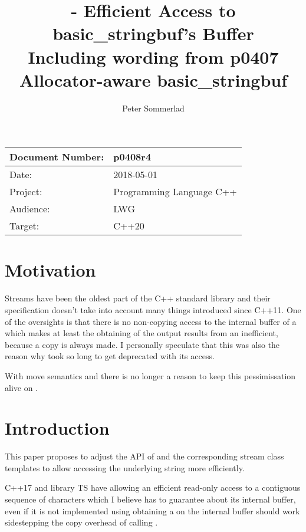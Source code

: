 \documentclass[ebook,11pt,article]{memoir}
\title{\papernumber{} - Efficient Access to basic\_stringbuf's Buffer\\
Including wording from p0407 Allocator-aware basic\_stringbuf}
\author{Peter Sommerlad}
\date{\paperdate}                        %
\newcommand{\papernumber}{p0408r4}
\newcommand{\paperdate}{2018-05-01}
\begin{document}
\maketitle
\begin{tabular}[t]{|l|l|}\hline 
Document Number: & \papernumber  \\\hline
Date: & \paperdate \\\hline
Project: & Programming Language C++\\\hline 
Audience: & LWG\\\hline
Target: & C++20\\\hline
\end{tabular}

\chapter{Motivation}
Streams have been the oldest part of the C++ standard library and their specification doesn't take into account many things introduced since C++11. One of  the oversights is that there is no non-copying access to the internal buffer of a  which makes at least the obtaining of the output results from an  inefficient, because a copy is always made. I personally speculate that this was also the reason why  took so long to get deprecated with its  access.

With move semantics and  there is no longer a reason to keep this pessimissation alive on .


\chapter{Introduction}
This paper proposes to adjust the API of  and the corresponding stream class templates to allow accessing the underlying string more efficiently.

C++17 and library TS have  allowing an efficient read-only access to a contiguous sequence of characters which I believe  has to guarantee about its internal buffer, even if it is not implemented using  obtaining a  on the internal buffer should work sidestepping the copy overhead of calling . 
\end{document}
